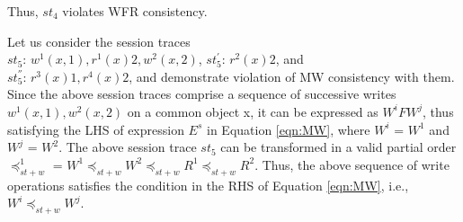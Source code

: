 \documentclass[journal,compsoc]{IEEEtran}
\begin{document}
Thus, $\mathit{st}_4$ violates %
 WFR consistency.
 \par Let us consider the session traces \\ $\mathit{st}_5$: $w^1(x,1), r^1(x){2}, w^2(x,2)$, $\mathit{st}_5^{'}$: $r^2(x){2}$, and \\
 $\mathit{st}_5^{''}$: $r^3(x){1}, r^4(x){2}$, and demonstrate violation of
  MW consistency with them. Since the above session traces comprise a sequence of successive writes $w^1(x,1), w^2(x,2)$ on a common object x,
   it can be expressed as $W^i F W^j$, thus satisfying the LHS of  expression $E^s$ in Equation \ref{eqn:MW}, where $W^i$ = $W^1$ and $W^j$ = $W^2$. The above session trace $\mathit{st}_5$  can be transformed in a valid partial order 
  $\preccurlyeq_{\mathit{st}+w}^1$ = $W^1 \preccurlyeq_{\mathit{st}+w} W^2 \preccurlyeq_{\mathit{st}+w} R^1 \preccurlyeq_{\mathit{st}+w} R^2$. 
   Thus, the above sequence of write operations satisfies the condition in the RHS of Equation \ref{eqn:MW},
  i.e., $W^i \preccurlyeq_{\mathit{st}+w} W^j$.  %
\end{document}
